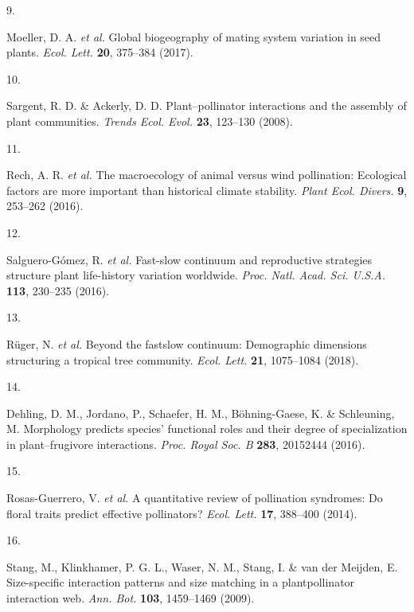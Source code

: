 \documentclass[
  12pt,
  a4paper,
]{article}
\newlength{\cslhangindent}
\newlength{\csllabelwidth}
\newlength{\cslentryspacingunit} %
\newenvironment{CSLReferences}[2] %
 {%
  \setlength{\parindent}{0pt}
  \ifodd #1
  \let\oldpar\par
  \def\par{\hangindent=\cslhangindent\oldpar}
  \fi
  \setlength{\parskip}{#2\cslentryspacingunit}
 }%
 {}
\newcommand{\CSLLeftMargin}[1]{\parbox[t]{\csllabelwidth}{#1}}
\newcommand{\CSLRightInline}[1]{\parbox[t]{\linewidth - \csllabelwidth}{#1}\break}
\begin{document}
\begin{CSLReferences}{0}{0}
\leavevmode{}%
\CSLLeftMargin{9. }
\CSLRightInline{Moeller, D. A. \emph{et al.} Global biogeography of mating system variation in seed plants. \emph{Ecol. Lett.} \textbf{20}, 375--384 (2017).}

\leavevmode{}%
\CSLLeftMargin{10. }
\CSLRightInline{Sargent, R. D. \& Ackerly, D. D. Plant--pollinator interactions and the assembly of plant communities. \emph{Trends Ecol. Evol.} \textbf{23}, 123--130 (2008).}

\leavevmode{}%
\CSLLeftMargin{11. }
\CSLRightInline{Rech, A. R. \emph{et al.} The macroecology of animal versus wind pollination: Ecological factors are more important than historical climate stability. \emph{Plant Ecol. Divers.} \textbf{9}, 253--262 (2016).}

\leavevmode{}%
\CSLLeftMargin{12. }
\CSLRightInline{Salguero-Gómez, R. \emph{et al.} Fast-slow continuum and reproductive strategies structure plant life-history variation worldwide. \emph{Proc. Natl. Acad. Sci. U.S.A.} \textbf{113}, 230--235 (2016).}

\leavevmode{}%
\CSLLeftMargin{13. }
\CSLRightInline{Rüger, N. \emph{et al.} Beyond the fast\textendash slow continuum: Demographic dimensions structuring a tropical tree community. \emph{Ecol. Lett.} \textbf{21}, 1075--1084 (2018).}

\leavevmode{}%
\CSLLeftMargin{14. }
\CSLRightInline{Dehling, D. M., Jordano, P., Schaefer, H. M., Böhning-Gaese, K. \& Schleuning, M. Morphology predicts species' functional roles and their degree of specialization in plant--frugivore interactions. \emph{Proc. Royal Soc. B} \textbf{283}, 20152444 (2016).}

\leavevmode{}%
\CSLLeftMargin{15. }
\CSLRightInline{Rosas-Guerrero, V. \emph{et al.} A quantitative review of pollination syndromes: Do floral traits predict effective pollinators? \emph{Ecol. Lett.} \textbf{17}, 388--400 (2014).}

\leavevmode{}%
\CSLLeftMargin{16. }
\CSLRightInline{Stang, M., Klinkhamer, P. G. L., Waser, N. M., Stang, I. \& van der Meijden, E. Size-specific interaction patterns and size matching in a plant\textendash pollinator interaction web. \emph{Ann. Bot.} \textbf{103}, 1459--1469 (2009).}


\end{CSLReferences}
\end{document}

